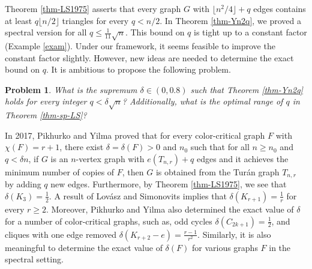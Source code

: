 \documentclass[11pt]{article}
\newtheorem{problem}[theorem]{Problem}
\begin{document}
\medskip 
Theorem \ref{thm-LS1975} asserts that 
 every graph $G$ with $\lfloor n^2/4\rfloor +q$ 
 edges contains at least $q \lfloor n/2\rfloor$ triangles for every $q< n/2$. 
In Theorem \ref{thm-Yn2q}, 
we proved a spectral version for all $q\le \frac{1}{11}\sqrt{n}$. 
This bound on $q$ is tight up to a constant factor (Example \ref{exam}). 
Under our framework, it seems feasible to improve the constant factor slightly. However, new ideas are needed to determine the exact bound on $q$. It is ambitious to propose the following problem. 

\begin{problem}  \label{prob7-4}
 What is the supremum $\delta \in (0,0.8)$ such that Theorem \ref{thm-Yn2q} holds for every integer $q< \delta \sqrt{n}$? Additionally, what is the optimal range of $q$ in Theorem \ref{thm-sp-LS}?  
 \end{problem}


In 2017, 
 Pikhurko and Yilma \cite{PY2017} 
 proved that for every color-critical graph 
 $F$ with $\chi (F)=r+1$, 
there exist $\delta =\delta (F)>0$
and $n_0$ such that
for all $n\ge n_0$  and $q < \delta n$,
if $G$ is an $n$-vertex graph
with $e(T_{n,r}) +q$ edges and it achieves the minimum 
number of copies of $F$, 
then $G$ is obtained from the Tur\'{a}n graph $T_{n,r}$ by adding $q$ new edges.  Furthermore, 
by Theorem \ref{thm-LS1975}, we see that $\delta (K_3)= \frac{1}{2}$. A result of Lov\'{a}sz and Simonovits \cite{LS1975,LS1983} implies that $\delta(K_{r+1})=\frac{1}{r}$ for every $r\ge 2$.  
Moreover, Pikhurko and Yilma \cite{PY2017} also determined the exact value of $\delta$ 
for a number of color-critical graphs, such as,  odd cycles $\delta (C_{2k+1}) =\frac{1}{2}$, and 
cliques with one edge removed $\delta (K_{r+2} -e) = \frac{r-1}{r^2}$.  Similarly, it is also meaningful to determine the exact value of $\delta (F)$ for various graphs $F$ in the spectral setting. 

\end{document}
